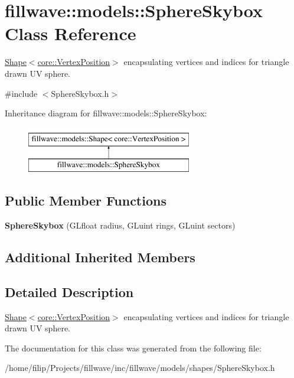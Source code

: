 \hypertarget{classfillwave_1_1models_1_1SphereSkybox}{}\section{fillwave\+:\+:models\+:\+:Sphere\+Skybox Class Reference}
\label{classfillwave_1_1models_1_1SphereSkybox}


\hyperlink{classfillwave_1_1models_1_1Shape}{Shape$<$core\+::\+Vertex\+Position$>$} encapsulating vertices and indices for triangle drawn U\+V sphere.  




{\ttfamily \#include $<$Sphere\+Skybox.\+h$>$}

Inheritance diagram for fillwave\+:\+:models\+:\+:Sphere\+Skybox\+:\begin{figure}[H]
\begin{center}
\leavevmode
\includegraphics[height=2.000000cm]{classfillwave_1_1models_1_1SphereSkybox}
\end{center}
\end{figure}
\subsection*{Public Member Functions}
\begin{DoxyCompactItemize}
\item 
\hypertarget{classfillwave_1_1models_1_1SphereSkybox_a75e2789078ec1237ed7d755c31f32032}{}{\bfseries Sphere\+Skybox} (G\+Lfloat radius, G\+Luint rings, G\+Luint sectors)\label{classfillwave_1_1models_1_1SphereSkybox_a75e2789078ec1237ed7d755c31f32032}

\end{DoxyCompactItemize}
\subsection*{Additional Inherited Members}


\subsection{Detailed Description}
\hyperlink{classfillwave_1_1models_1_1Shape}{Shape$<$core\+::\+Vertex\+Position$>$} encapsulating vertices and indices for triangle drawn U\+V sphere. 

The documentation for this class was generated from the following file\+:\begin{DoxyCompactItemize}
\item 
/home/filip/\+Projects/fillwave/inc/fillwave/models/shapes/Sphere\+Skybox.\+h\end{DoxyCompactItemize}
